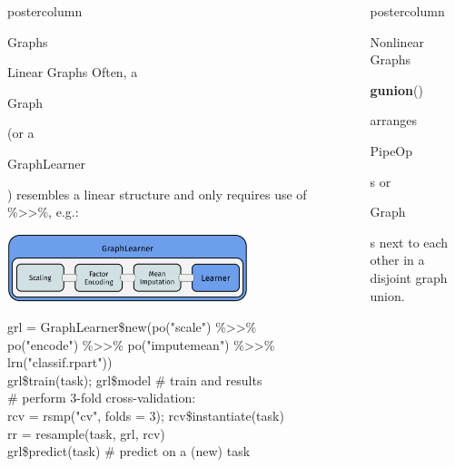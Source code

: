 \documentclass{beamer}
\newlength{\columnheight} %
\newcommand{\codeinline}[1]{\begin{codeboxinline}#1\end{codeboxinline}}
\begin{document}
\begin{frame}[fragile]{}
\begin{columns}
\begin{column}{.245\textwidth}
\begin{beamercolorbox}[center]{postercolumn}
\begin{minipage}{.98\textwidth}
{\begin{myblock}{Graphs}
						\end{myblock}
            \begin{myblock}{Linear Graphs}
              Often, a \codeinline{Graph} (or a \codeinline{GraphLearner}) resembles a linear structure and only requires use of \%>{}>\%, e.g.:
              \begin{center}
                \includegraphics[width=0.7\textwidth]{img/grl_linear.pdf}
              \end{center}
              \begin{codeboxexample}
                {\footnotesize
                  grl = GraphLearner\$new(po("scale") \%>{}>\%\\
                  \hspace*{1ex} po("encode") \%>{}>\% po("imputemean") \%>{}>\% \\
                  \hspace*{1ex} lrn("classif.rpart"))\\
                  grl\$train(task); grl\$model \# train and results\\
                  \# perform 3-fold cross-validation:\\
                  rcv = rsmp("cv", folds = 3); rcv\$instantiate(task)\\
                  rr = resample(task, grl, rcv)\\
                  grl\$predict(task) \# predict on a (new) task}
              \end{codeboxexample}
            \end{myblock}
						\vfill}
				\end{minipage}
			\end{beamercolorbox}
		\end{column}
		\begin{column}{.245\textwidth}
			\begin{beamercolorbox}[center]{postercolumn}
				\begin{minipage}{.98\textwidth}
					\parbox[t][\columnheight]{\textwidth}{
            \begin{myblock}{Nonlinear Graphs}
              \codeinline{\textbf{gunion}()} arranges \codeinline{PipeOp}s or \codeinline{Graph}s next to each other in a disjoint graph union.

\end{myblock}}
\end{minipage}
\end{beamercolorbox}
\end{column}
\end{columns}
\end{frame}
\end{document}
